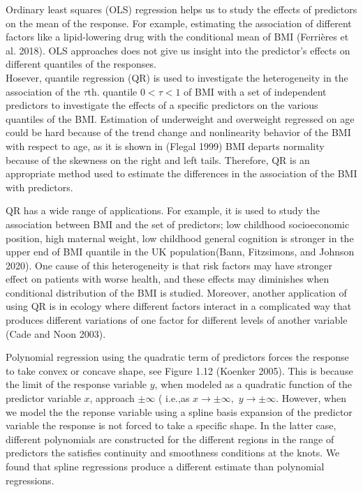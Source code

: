 \documentclass[
  12pt,
]{article}
\begin{document}
Ordinary least squares (OLS) regression helps us to study the effects of predictors on the mean of the response. For example, estimating the association of different factors like a lipid-lowering drug with the conditional mean of BMI (Ferrières et al. 2018). OLS approaches does not give us insight into the predictor's effects on different quantiles of the responses.\\
Hosever, quantile regression (QR) is used to investigate the heterogeneity in the association of the \(\tau\)th. quantile \(0<\tau<1\) of BMI with a set of independent predictors to investigate the effects of a specific predictors on the various quantiles of the BMI. Estimation of underweight and overweight regressed on age could be hard because of the trend change and nonlinearity behavior of the BMI with respect to age, as it is shown in (Flegal 1999) BMI departs normality because of the skewness on the right and left tails. Therefore, QR is an appropriate method used to estimate the differences in the association of the BMI with predictors.

QR has a wide range of applications. For example, it is used to study the association between BMI and the set of predictors; low childhood socioeconomic position, high maternal weight, low childhood general cognition is stronger in the upper end of BMI quantile in the UK population(Bann, Fitzsimons, and Johnson 2020). One cause of this heterogeneity is that risk factors may have stronger effect on patients with worse health, and these effects may diminishes when conditional distribution of the BMI is studied.
Moreover, another application of using QR is in ecology where different factors interact in a complicated way that produces different variations of one factor for different levels of another variable (Cade and Noon 2003).

Polynomial regression using the quadratic term of predictors forces the response to take convex or concave shape, see Figure 1.12 (Koenker 2005). This is because the limit of the response variable \(y\), when modeled as a quadratic function of the predictor variable \(x\), approach \(\pm\infty\) ( i.e.,as \(x \rightarrow\pm\infty,\) \(y\rightarrow\pm\infty.\) However, when we model the the reponse variable using a spline basis expansion of the predictor variable the response is not forced to take a specific shape. In the latter case, different polynomials are constructed for the different regions in the range of predictors the satisfies continuity and smoothness conditions at the knots.
We found that spline regressions produce a different estimate than polynomial regressions.
\end{document}
